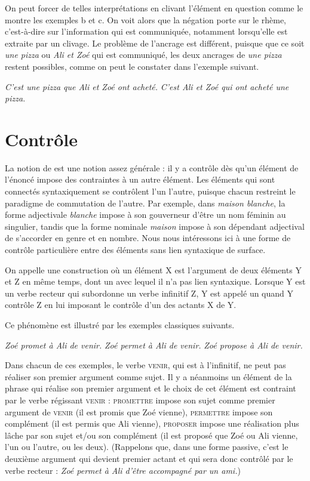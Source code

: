 {On peut forcer de telles interprétations en clivant l’élément en question comme le montre les exemples b et c. On voit alors que la négation porte sur le rhème, c’est-à-dire sur l’information qui est communiquée, notamment lorsqu’elle est extraite par un clivage. Le problème de l’ancrage est différent, puisque que ce soit \textit{une pizza} ou \textit{Ali et Zoé} qui est communiqué, les deux ancrages de \textit{une pizza} restent possibles, comme on peut le constater dans l’exemple suivant.

\ea
\ea \textit{C’est une pizza que Ali et Zoé ont acheté.}
\ex \textit{C’est Ali et Zoé qui ont acheté une pizza.}\z\z}

\section{Contrôle}
\label{sec:13-contrôle}
La notion de  est une notion assez générale : il y a contrôle dès qu’un élément de l’énoncé impose des contraintes à un autre élément. Les éléments qui sont connectés syntaxiquement se contrôlent l’un l’autre, puisque chacun restreint le paradigme de commutation de l’autre. Par exemple, dans \textit{maison blanche}, la forme adjectivale \textit{blanche} impose à son gouverneur d’être un nom féminin au singulier, tandis que la forme nominale \textit{maison} impose à son dépendant adjectival de s’accorder en genre et en nombre. Nous nous intéressons ici à une forme de contrôle particulière entre des éléments sans lien syntaxique de surface.

{On appelle  une construction où un élément X est l’argument de deux éléments Y et Z en même temps, dont un avec lequel il n’a pas lien syntaxique. Lorsque Y est un verbe recteur qui subordonne un verbe infinitif Z, Y est appelé un  quand Y contrôle Z en lui imposant le contrôle d’un des actants X de Y.}

Ce phénomène est illustré par les exemples classiques suivants.

\ea\label{ex:13-venir}
\ea\textit{Zoé promet à Ali de venir.}
\ex\textit{Zoé permet à Ali de venir.}
\ex\textit{Zoé propose à Ali de venir.}\z\z

Dans chacun de ces exemples, le verbe \textsc{venir}, qui est à l’infinitif, ne peut pas réaliser son premier argument comme sujet. Il y a néanmoins un élément de la phrase qui réalise son premier argument et le choix de cet élément est contraint par le verbe régissant \textsc{venir} : \textsc{promettre} impose son sujet comme premier argument de \textsc{venir}  (il est promis que Zoé vienne), \textsc{permettre} impose son complément  (il est permis que Ali vienne), \textsc{proposer} impose une réalisation plus lâche par son sujet et/ou son complément  (il est proposé que Zoé ou Ali vienne, l’un ou l’autre, ou les deux). (Rappelons que, dans une forme passive, c’est le deuxième argument qui devient premier actant et qui sera donc contrôlé par le verbe recteur : \textit{Zoé permet à Ali d’être accompagné par un ami.})

